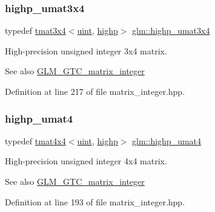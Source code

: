 \subsubsection{\texorpdfstring{highp\_umat3x4}{highp\_umat3x4}}
{\footnotesize\ttfamily typedef \mbox{\hyperlink{structglm_1_1tmat3x4}{tmat3x4}}$<$\mbox{\hyperlink{group__core__precision_ga4fd29415871152bfb5abd588334147c8}{uint}}, \mbox{\hyperlink{namespaceglm_a0f04f086094c747d227af4425893f545ac6f7eab42eacbb10d59a58e95e362074}{highp}}$>$ \mbox{\hyperlink{group__gtc__matrix__integer_gaa2fb29026c9c80c7d17b5389e36d6aa7}{glm\+::highp\+\_\+umat3x4}}}

High-\/precision unsigned integer 3x4 matrix. \begin{DoxySeeAlso}{See also}
\mbox{\hyperlink{group__gtc__matrix__integer}{G\+L\+M\+\_\+\+G\+T\+C\+\_\+matrix\+\_\+integer}} 
\end{DoxySeeAlso}


Definition at line 217 of file matrix\+\_\+integer.\+hpp.

\mbox{\label{group__gtc__matrix__integer_ga7b0e78c54432c7236d8b96473b7423ec}} 
\subsubsection{\texorpdfstring{highp\_umat4}{highp\_umat4}}
{\footnotesize\ttfamily typedef \mbox{\hyperlink{structglm_1_1tmat4x4}{tmat4x4}}$<$\mbox{\hyperlink{group__core__precision_ga4fd29415871152bfb5abd588334147c8}{uint}}, \mbox{\hyperlink{namespaceglm_a0f04f086094c747d227af4425893f545ac6f7eab42eacbb10d59a58e95e362074}{highp}}$>$ \mbox{\hyperlink{group__gtc__matrix__integer_ga7b0e78c54432c7236d8b96473b7423ec}{glm\+::highp\+\_\+umat4}}}

High-\/precision unsigned integer 4x4 matrix. \begin{DoxySeeAlso}{See also}
\mbox{\hyperlink{group__gtc__matrix__integer}{G\+L\+M\+\_\+\+G\+T\+C\+\_\+matrix\+\_\+integer}} 
\end{DoxySeeAlso}


Definition at line 193 of file matrix\+\_\+integer.\+hpp.

\mbox{\label{group__gtc__matrix__integer_ga4015bf99a981bf271fd516f9b2cb6724}} 
